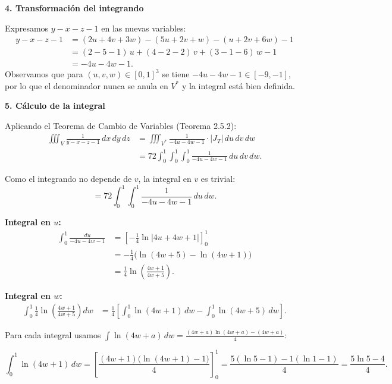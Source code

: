\textbf{4. Transformación del integrando}

\medskip

Expresamos $y - x - z - 1$ en las nuevas variables:
\begin{align*}
    y - x - z - 1 &= (2u + 4v + 3w) - (5u + 2v + w) - (u + 2v + 6w) - 1\\
                  &= (2 - 5 - 1)\,u + (4 - 2 - 2)\,v + (3 - 1 - 6)\,w - 1\\
                  &= -4u - 4w - 1.
\end{align*}
Observamos que para $(u,v,w) \in [0,1]^3$ se tiene $-4u - 4w - 1 \in [-9,-1]$,
por lo que el denominador nunca se anula en $V^*$ y la integral está bien definida.

\bigskip

\textbf{5. Cálculo de la integral}

\medskip

Aplicando el Teorema de Cambio de Variables (Teorema 2.5.2):
\begin{align*}
    \iiint_{V} \frac{1}{y-x-z-1}\,dx\,dy\,dz
    &= \iiint_{V^*} \frac{1}{-4u - 4w - 1}\cdot|J_T|\,du\,dv\,dw\\[6pt]
    &= 72\int_0^1\int_0^1\int_0^1 \frac{1}{-4u-4w-1}\,du\,dv\,dw.
\end{align*}

Como el integrando no depende de $v$, la integral en $v$ es trivial:
\[
    = 72\int_0^1\int_0^1 \frac{1}{-4u-4w-1}\,du\,dw.
\]

\textbf{Integral en $u$:}
\begin{align*}
    \int_0^1 \frac{du}{-4u-4w-1}
    &= \left[-\frac{1}{4}\ln\lvert 4u+4w+1\rvert\right]_0^1\\
    &= -\frac{1}{4}\bigl(\ln(4w+5) - \ln(4w+1)\bigr)\\
    &= \frac{1}{4}\ln\!\left(\frac{4w+1}{4w+5}\right).
\end{align*}

\textbf{Integral en $w$:}
\begin{align*}
    \int_0^1 \frac{1}{4}\ln\!\left(\frac{4w+1}{4w+5}\right)dw
    &= \frac{1}{4}\left[\int_0^1\ln(4w+1)\,dw - \int_0^1\ln(4w+5)\,dw\right].
\end{align*}

Para cada integral usamos $\displaystyle\int \ln(4w+a)\,dw = \frac{(4w+a)\ln(4w+a) - (4w+a)}{4}$:

\[
    \int_0^1 \ln(4w+1)\,dw
    = \left[\frac{(4w+1)\bigl(\ln(4w+1)-1\bigr)}{4}\right]_0^1
    = \frac{5(\ln 5 - 1) - 1(\ln 1 - 1)}{4}
    = \frac{5\ln 5 - 4}{4}.
\]

